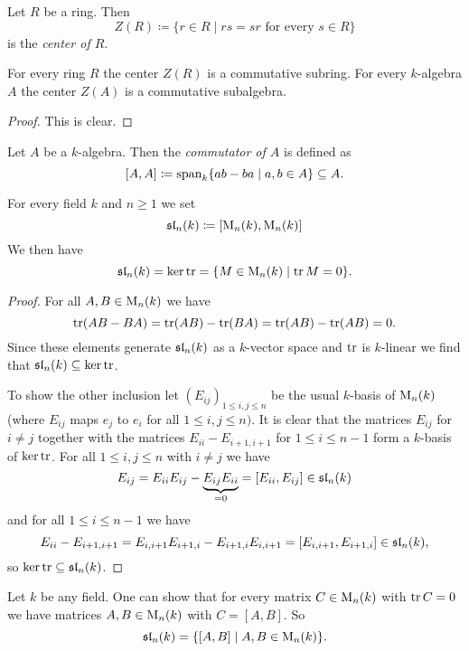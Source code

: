 \begin{defi}
  Let $R$ be a ring. Then
  \[
    Z(R) \coloneqq \{r \in R \mid rs = sr \text{ for every } s \in R\}
  \]
  is the \emph{center of $R$}.
\end{defi}


\begin{lem}
  For every ring $R$ the center $Z(R)$ is a commutative subring. For every $k$-algebra $A$ the center $Z(A)$ is a commutative subalgebra.
\end{lem}
\begin{proof}
  This is clear.
\end{proof}


\begin{defi}
  Let $A$ be a $k$-algebra. Then the \emph{commutator of $A$} is defined as
  \[
    [A,A] \coloneqq \operatorname{span}_k \{ab-ba \mid a,b \in A\} \subseteq A.
  \]
\end{defi}


\begin{expl}
  For every field $k$ and $n \geq 1$ we set
  \[
    \operatorname{\mathfrak{sl}}_n(k) \coloneqq [\operatorname{M}_n(k), \operatorname{M}_n(k)]
  \]
  We then have
  \[
    \operatorname{\mathfrak{sl}}_n(k) = \ker \operatorname{tr} = \{M \in \operatorname{M}_n(k) \mid \operatorname{tr} M = 0\}.
  \]
  \begin{proof}
    For all $A, B \in \operatorname{M}_n(k)$ we have
    \[
      \operatorname{tr}(AB-BA) = \operatorname{tr}(AB)-\operatorname{tr}(BA) = \operatorname{tr}(AB)-\operatorname{tr}(AB) = 0.
    \]
    Since these elements generate $\operatorname{\mathfrak{sl}}_n(k)$ as a $k$-vector space and $\operatorname{tr}$ is $k$-linear we find that $\operatorname{\mathfrak{sl}}_n(k) \subseteq \ker \operatorname{tr}$.
    
    To show the other inclusion let $(E_{ij})_{1 \leq i,j \leq n}$ be the usual $k$-basis of $\operatorname{M}_n(k)$ (where $E_{ij}$ maps $e_j$ to $e_i$ for all $1 \leq i,j \leq n)$. It is clear that the matrices $E_{ij}$ for $i \neq j$ together with the matrices $E_{ii}-E_{i+1,i+1}$ for $1 \leq i \leq n-1$ form a $k$-basis of $\ker \operatorname{tr}$. For all $1 \leq i,j \leq n$ with $i \neq j$ we have
    \[
      E_{ij} = E_{ii} E_{ij} - \underbrace{E_{ij} E_{ii}}_{=0} = [E_{ii}, E_{ij}] \in \operatorname{\mathfrak{sl}}_n(k)
    \]
    and for all $1 \leq i \leq n-1$ we have
    \[
      E_{ii} - E_{i+1,i+1} = E_{i,i+1} E_{i+1,i} - E_{i+1,i} E_{i,i+1} = [E_{i,i+1}, E_{i+1,i}] \in \operatorname{\mathfrak{sl}}_n(k),
    \]
    so $\ker \operatorname{tr} \subseteq \operatorname{\mathfrak{sl}}_n(k)$.
  \end{proof}
\end{expl}


\begin{rem}
  Let $k$ be any field. One can show that for every matrix $C \in \operatorname{M}_n(k)$ with $\operatorname{tr} C = 0$ we have matrices $A, B \in \operatorname{M}_n(k)$ with $C = [A,B]$. So
  \[
    \operatorname{\mathfrak{sl}}_n(k) = \{[A,B] \mid A, B \in \operatorname{M}_n(k)\}.
  \]
\end{rem}


